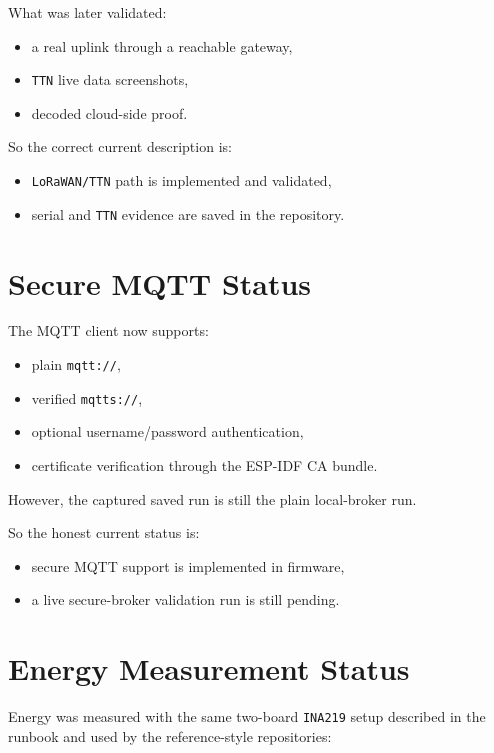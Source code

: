 \documentclass[12pt,a4paper]{article}
\begin{document}
What was later validated:

\begin{itemize}
    \item a real uplink through a reachable gateway,
    \item \texttt{TTN} live data screenshots,
    \item decoded cloud-side proof.
\end{itemize}

So the correct current description is:

\begin{itemize}
    \item \texttt{LoRaWAN/TTN} path is implemented and validated,
    \item serial and \texttt{TTN} evidence are saved in the repository.
\end{itemize}

\section{Secure MQTT Status}

The MQTT client now supports:

\begin{itemize}
    \item plain \texttt{mqtt://},
    \item verified \texttt{mqtts://},
    \item optional username/password authentication,
    \item certificate verification through the ESP-IDF CA bundle.
\end{itemize}

However, the captured saved run is still the plain local-broker run.

So the honest current status is:

\begin{itemize}
    \item secure MQTT support is implemented in firmware,
    \item a live secure-broker validation run is still pending.
\end{itemize}

\section{Energy Measurement Status}

Energy was measured with the same two-board \texttt{INA219} setup described in
the runbook and used by the reference-style repositories:
\end{document}
